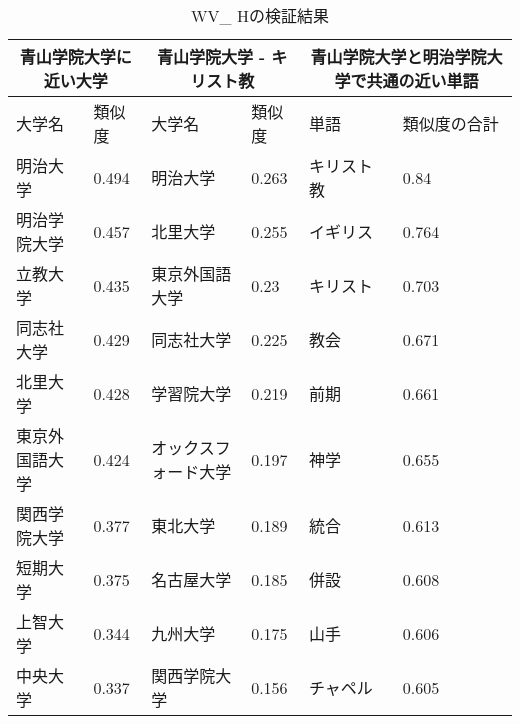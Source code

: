 \begin{table}[H]
\caption{WV\_ Hの検証結果}
\centering
\footnotesize
\begin{tabular}{ll|ll|ll}
\hline
\multicolumn{2}{c}{青山学院大学に近い大学} & \multicolumn{2}{c}{青山学院大学 - キリスト教} & \multicolumn{2}{c}{青山学院大学と明治学院大学で共通の近い単語}
\\ \hline
大学名 & 類似度 & 大学名 & 類似度 & 単語 & 類似度の合計
\\ \hline \hline
明治大学 & 0.494 & 明治大学 & 0.263 & キリスト教 & 0.84\\
明治学院大学 & 0.457 & 北里大学 & 0.255 & イギリス & 0.764\\
立教大学 & 0.435 & 東京外国語大学 & 0.23 & キリスト & 0.703\\
同志社大学 & 0.429 & 同志社大学 & 0.225 & 教会 & 0.671\\
北里大学 & 0.428 & 学習院大学 & 0.219 & 前期 & 0.661\\
東京外国語大学 & 0.424 & オックスフォード大学 & 0.197 & 神学 & 0.655\\
関西学院大学 & 0.377 & 東北大学 & 0.189 & 統合 & 0.613\\
短期大学 & 0.375 & 名古屋大学 & 0.185 & 併設 & 0.608\\
上智大学 & 0.344 & 九州大学 & 0.175 & 山手 & 0.606\\
中央大学 & 0.337 & 関西学院大学 & 0.156 & チャペル & 0.605\\ \hline
\end{tabular}
\label{table:wvh}
\end{table}